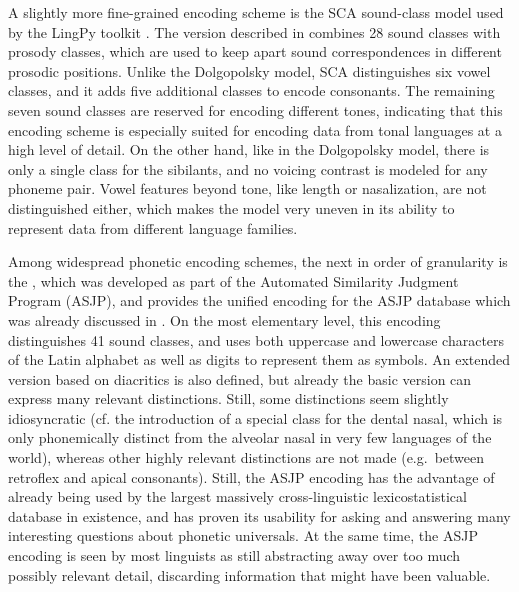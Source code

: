 A slightly more fine-grained encoding scheme is the SCA sound-class model used by the LingPy toolkit \citep{list_forkel_2016}. The version described in \cite{list2012sca} combines 28 sound classes with prosody classes, which are used to keep apart sound correspondences in different prosodic positions. Unlike the Dolgopolsky model, SCA distinguishes six vowel classes, and it adds five additional classes to encode consonants. The remaining seven sound classes are reserved for encoding different tones, indicating that this encoding scheme is especially suited for encoding data from tonal languages at a high level of detail. On the other hand, like in the Dolgopolsky model, there is only a single class for the sibilants, and no voicing contrast is modeled for any phoneme pair. Vowel features beyond tone, like length or nasalization, are not distinguished either, which makes the model very uneven in its ability to represent data from different language families.

Among widespread phonetic encoding schemes, the next in order of granularity is the , which was developed as part of the Automated Similarity Judgment Program (ASJP), and provides the unified encoding for the ASJP database which was already discussed in . On the most elementary level, this encoding distinguishes 41 sound classes, and uses both uppercase and lowercase characters of the Latin alphabet as well as digits to represent them as symbols. An extended version based on diacritics is also defined, but already the basic version can express many relevant distinctions. Still, some distinctions seem slightly idiosyncratic (cf. the introduction of a special class for the dental nasal, which is only phonemically distinct from the alveolar nasal in very few languages of the world), whereas other highly relevant distinctions are not made (e.g.\ between retroflex and apical consonants). Still, the ASJP encoding has the advantage of already being used by the largest massively cross-linguistic lexicostatistical database in existence, and has proven its usability for asking and answering many interesting questions about phonetic universals. At the same time, the ASJP encoding is seen by most linguists as still abstracting away over too much possibly relevant detail, discarding information that might have been valuable.

